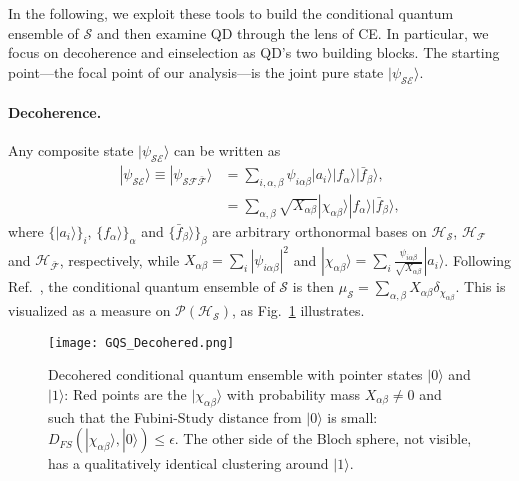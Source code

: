 \documentclass[a4paper,11pt,accepted=2024-09-14]{quantumarticle}
\newcommand{\ket}[1]    {| #1 \rangle}
\newcommand{\PH}    {\mathcal{P}\left( \mc{H}\right)}
\newcommand{\+}         {\dagger}
\newcommand{\mc}[1]{\mathcal{#1}}
\begin{document}
In the following, we exploit these tools to build the {conditional quantum ensemble} of $\mc{S}$ and then examine QD through the lens of CE. In particular, we focus on decoherence and einselection as QD's two building blocks. The starting point---the focal point of our analysis---is the joint pure state $|\psi_{\mc{SE}}\rangle$.

\paragraph{Decoherence.}
Any composite state $\ket{\psi_{\mc{S}\mc{E}}}$ can be written as
\begin{equation}
\begin{split}
|\psi_{\mc{SE}}\rangle\equiv |\psi_{\mc{SF\bar{F}}}\rangle&= \sum_{i, \alpha, \beta} \psi_{i\alpha\beta} |a_i\rangle |f_{\alpha}\rangle |\bar{f}_{\beta}\rangle,\\
&= \sum_{\alpha, \beta} \sqrt{X_{\alpha\beta}} |\chi_{\alpha\beta}\rangle |f_{\alpha}\rangle |\bar{f}_{\beta}\rangle,
\end{split}
\end{equation}
where $\{|a_i\rangle\}_i$, $\{f_{\alpha}\rangle\}_{\alpha}$ and $\{\bar{f}_{\beta}\rangle\}_{\beta}$ are arbitrary orthonormal bases on $\mc{H}_{\mc{S}}$, $\mc{H}_{\mc{F}}$ and $\mc{H}_{\bar{\mc{F}}}$, respectively, while $X_{\alpha\beta}=\sum_i |\psi_{i\alpha\beta}|^2$ and $\ket{\chi_{\alpha\beta}}=\sum_i \frac{\psi_{i\alpha \beta}}{\sqrt{X_{\alpha \beta}}}\ket{a_i}$. 
Following Ref.~\cite{fabioGQ1}, the {conditional quantum ensemble} of $\mc{S}$ is then $\mu_{\mc{S}}=\sum_{\alpha, \beta} X_{\alpha \beta} \delta_{\chi_{\alpha \beta}}$. This is visualized as a measure on $\mathcal{P}\left( \mc{H}_{\mc{S}}\right)$, as Fig.~\ref{fig:gqs} illustrates.

\begin{figure}
    \centering
    \texttt{[image: GQS\_Decohered.png]}
    \caption{Decohered {conditional quantum ensemble} with pointer states $\ket{0}$ and $\ket{1}$: Red points are the $\ket{\chi_{\alpha\beta}}$ with probability mass $X_{\alpha \beta}\neq 0$ and such that the Fubini-Study distance from $\ket{0}$ is small: $D_{FS}(\ket{\chi_{\alpha \beta}},\ket{0})\leq \epsilon$. The other side of the Bloch sphere, not visible, has a qualitatively identical clustering around $\ket{1}$.}
    \label{fig:gqs}
\end{figure}
\end{document}
